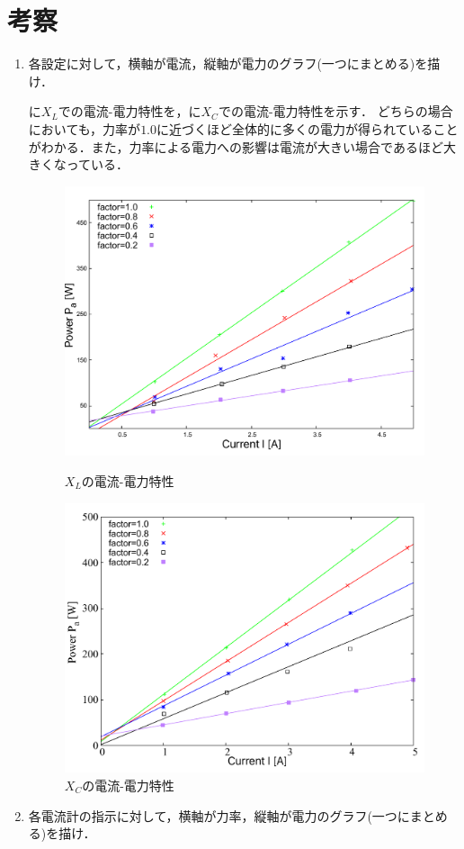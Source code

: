 \clearpage
\section{考察}
\begin{enumerate}[1.)]
	\item 各設定に対して，横軸が電流，縦軸が電力のグラフ(一つにまとめる)を描け．
	
	に$X_{L}$での電流-電力特性を，に$X_{C}$での電流-電力特性を示す．
	どちらの場合においても，力率が$1.0$に近づくほど全体的に多くの電力が得られていることがわかる．また，力率による電力への影響は電流が大きい場合であるほど大きくなっている．
	\begin{figure}[h]
	\centering
	\includegraphics[scale=0.7]{./data/L/L.pdf}
	\caption{$X_L$の電流-電力特性}
	\label{fig:L}
	\includegraphics[scale=0.7]{./data/C/C.pdf}
	\caption{$X_C$の電流-電力特性}
	\label{fig:C}
	\end{figure}
	\newpage
	\item 各電流計の指示に対して，横軸が力率，縦軸が電力のグラフ(一つにまとめる)を描け．
	

\end{enumerate}
